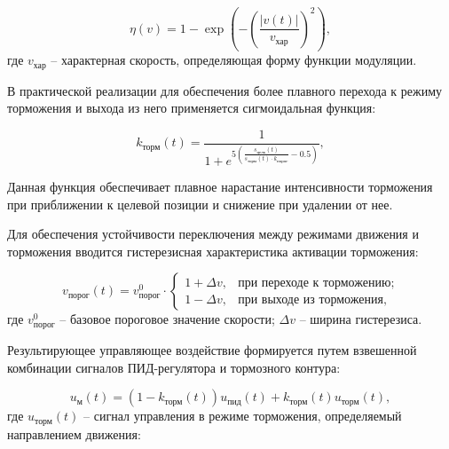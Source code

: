 \begin{equation}\label{eq:modulation_function}
	\eta(v) = 1 - \exp\left(-\left(\frac{|v(t)|}{v_{\text{хар}}}\right)^2\right),
\end{equation}
где $v_{\text{хар}}$ -- характерная скорость, определяющая форму функции модуляции.

В практической реализации для обеспечения более плавного перехода к режиму торможения и выхода из него применяется сигмоидальная функция:

\begin{equation}\label{eq:sigmoid_braking}
	k_{\text{торм}}(t) = \frac{1}{1 + e^{5\left(\frac{s_{\text{цель}}(t)}{s_{\text{торм}}(t) \cdot k_{\text{порог}}} - 0.5\right)}},
\end{equation}

Данная функция обеспечивает плавное нарастание интенсивности торможения при приближении к целевой позиции и снижение при удалении от нее.

Для обеспечения устойчивости переключения между режимами движения и торможения вводится гистерезисная характеристика активации торможения:

\begin{equation}\label{eq:hysteresis}
	v_{\text{порог}}(t) = v_{\text{порог}}^0 \cdot \begin{cases}
		1 + \Delta v, & \text{при переходе к торможению}; \\
		1 - \Delta v, & \text{при выходе из торможения},
	\end{cases}
\end{equation}
где $v_{\text{порог}}^0$ -- базовое пороговое значение скорости;
$\Delta v$ -- ширина гистерезиса.

Результирующее управляющее воздействие формируется путем
взвешенной комбинации сигналов ПИД-регулятора и тормозного контура:

\begin{equation}\label{eq:combined_control}
	u_{\text{м}}(t) = (1 - k_{\text{торм}}(t))u_{\text{пид}}(t) + k_{\text{торм}}(t)u_{\text{торм}}(t),
\end{equation}
где $u_{\text{торм}}(t)$ -- сигнал управления в режиме торможения, определяемый направлением движения:

